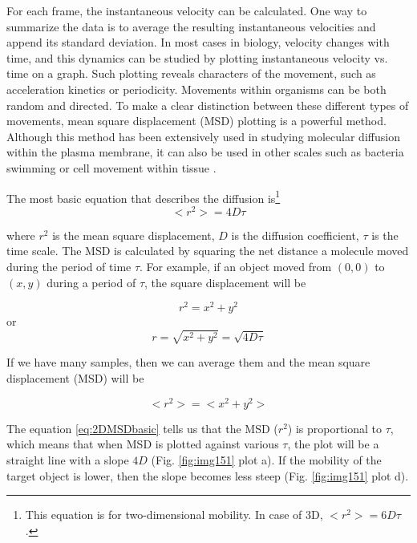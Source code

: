 For each frame, the instantaneous velocity can be calculated. One way to
summarize the data is to average the resulting instantaneous velocities
and append its standard deviation. In most cases in biology, velocity
changes with time, and this dynamics can be studied by plotting
instantaneous velocity vs. time on a graph. Such plotting reveals
characters of the movement, such as acceleration kinetics or
periodicity.
Movements within organisms can be both random and directed. To make a
clear distinction between these different types of movements, mean
square displacement (MSD) plotting is a powerful method. Although this
method has been extensively used in studying molecular diffusion within
the plasma membrane, it can also be used in other scales such as
bacteria swimming or cell movement within tissue \citep{bergbook1993,SaxtonAnnurevBiophys1997.pdf,kusumiBJ1993, witt2005PLOSB2005,suhADDR2005}.

The most basic equation that describes the diffusion is\footnote{ This equation is for two-dimensional mobility. In case of 3D,
$<r^{2}> = 6D\tau$.} 
\begin{equation}
<r^{2}>= 4D\tau
\end{equation}

where $r^{2}$ is the mean square
displacement, $D$ is the diffusion coefficient, $\tau$
is the time scale. The MSD is calculated by squaring the net distance a
molecule moved during the period of time $\tau $. For example,
if an object moved from $(0,0)$ to $(x, y)$ during a period of
$\tau $, the square displacement will be

\begin{equation}
r^{2} = x^{2 }+ y^{2 }
\end{equation}
or 
\begin{equation}
r = \sqrt{x^{2 }+ y^{2 }} = \sqrt{4 D \tau}
\end{equation}

If we have many samples, then we can average them and the mean square
displacement (MSD) will be

\begin{equation}
\label{eq:2DMSDbasic}
<r^{2}>=<x^{2} + y^{2}>
\end{equation}

The equation \ref{eq:2DMSDbasic} tells us that the MSD
($r^{2}$) is proportional to
$\tau$, which means that when MSD is plotted against various
$\tau$, the plot will be a straight line with a slope
$4D$ (Fig. \ref{fig:img151} plot a). If the mobility of
the target object is lower, then the slope becomes less steep
(Fig. \ref{fig:img151} plot d).


